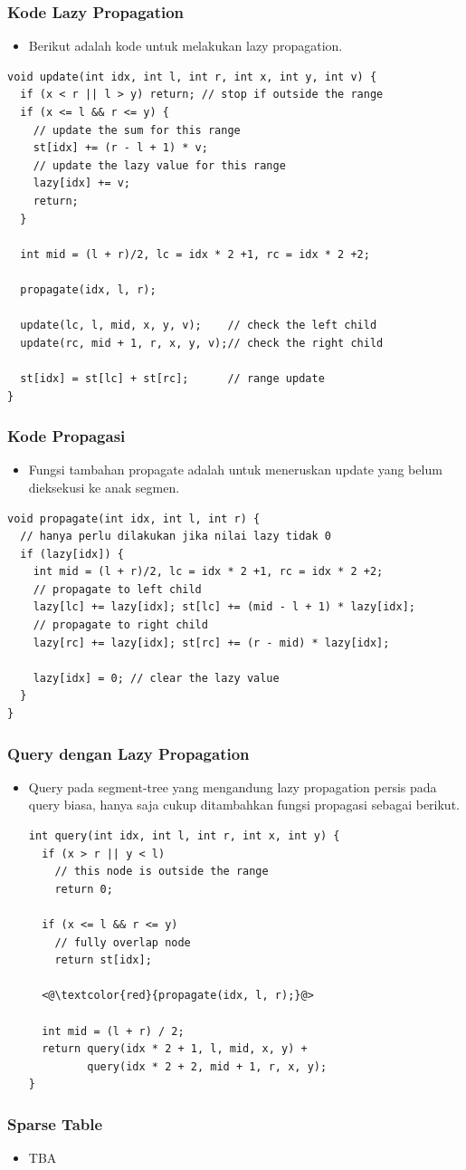 \begin{frame}[fragile]
\frametitle{Kode Lazy Propagation}
\begin{itemize}
  \item Berikut adalah kode untuk melakukan lazy propagation.
\end{itemize}
  \begin{lstlisting}
void update(int idx, int l, int r, int x, int y, int v) {
  if (x < r || l > y) return; // stop if outside the range
  if (x <= l && r <= y) {
    // update the sum for this range
    st[idx] += (r - l + 1) * v;     
    // update the lazy value for this range
    lazy[idx] += v;                 
    return;
  }
  
  int mid = (l + r)/2, lc = idx * 2 +1, rc = idx * 2 +2;

  propagate(idx, l, r);

  update(lc, l, mid, x, y, v);    // check the left child
  update(rc, mid + 1, r, x, y, v);// check the right child
  
  st[idx] = st[lc] + st[rc];      // range update
}
\end{lstlisting}
\end{frame}

\begin{frame}[fragile]
\frametitle{Kode Propagasi}
\begin{itemize}
  \item Fungsi tambahan propagate adalah untuk meneruskan update yang belum dieksekusi ke anak segmen.
\end{itemize}
  \begin{lstlisting}
void propagate(int idx, int l, int r) {
  // hanya perlu dilakukan jika nilai lazy tidak 0
  if (lazy[idx]) { 
    int mid = (l + r)/2, lc = idx * 2 +1, rc = idx * 2 +2;
    // propagate to left child
    lazy[lc] += lazy[idx]; st[lc] += (mid - l + 1) * lazy[idx]; 
    // propagate to right child
    lazy[rc] += lazy[idx]; st[rc] += (r - mid) * lazy[idx];

    lazy[idx] = 0; // clear the lazy value
  }
}
\end{lstlisting}
\end{frame}

\begin{frame}[fragile]
\frametitle{Query dengan Lazy Propagation}
\begin{itemize}
  \item Query pada segment-tree yang mengandung lazy propagation persis pada query biasa, hanya saja cukup ditambahkan fungsi propagasi sebagai berikut.
  \begin{lstlisting}
int query(int idx, int l, int r, int x, int y) {
  if (x > r || y < l)
    // this node is outside the range
    return 0;

  if (x <= l && r <= y)
    // fully overlap node
    return st[idx];

  <@\textcolor{red}{propagate(idx, l, r);}@>
  
  int mid = (l + r) / 2;
  return query(idx * 2 + 1, l, mid, x, y) + 
         query(idx * 2 + 2, mid + 1, r, x, y);
}
\end{lstlisting}
\end{itemize}
\end{frame}

\begin{frame}
\frametitle{Sparse Table}
\begin{itemize}
  \item TBA
\end{itemize}
\end{frame}


